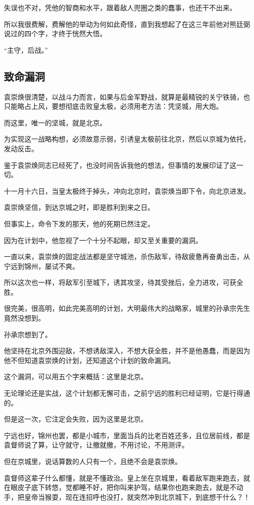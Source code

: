 \begin{multicols}{\theparacolNo}
失误也不对，凭他的智商和水平，跟着敌人兜圈之类的蠢事，也还干不出来。

所以我很费解，费解他的举动为何如此奇怪，直到我想起了在这三年前他对熊廷弼说过的四个字，才终于恍然大悟。

“主守，后战。”

\subsection{致命漏洞}
袁崇焕很清楚，以战斗力而言，如果与后金军野战，就算是最精锐的关宁铁骑，也只能略占上风，要想彻底击败皇太极，必须用老方法：凭坚城，用大炮。

而这里，唯一的坚城，就是北京。

为实现这一战略构想，必须故意示弱，引诱皇太极前往北京，然后以京城为依托，发动反击。

鉴于袁崇焕同志已经死了，也没时间告诉我他的想法，但事情的发展印证了这一切。

十一月十六日，当皇太极终于掉头，冲向北京时，袁崇焕当即下令，向北京进发。

袁崇焕坚信，到达京城之时，即是胜利到来之日。

但事实上，命令下发的那天，他的死期已然注定。

因为在计划中，他忽视了一个十分不起眼，却又至关重要的漏洞。

一直以来，袁崇焕的固定战法都是坚守城池，杀伤敌军，待敌疲惫再奋勇出击，从宁远到锦州，屡试不爽。

所以这次也一样，将敌军引至城下，诱其攻坚，待其受挫后，全力进攻，可获全胜。

很完美，很高明，如此完美高明的计划，大明最伟大的战略家，城里的孙承宗先生竟然没想到。

孙承宗想到了。

他坚持在北京外围迎敌，不想诱敌深入，不想大获全胜，并不是他愚蠢，而是因为他不但知道袁崇焕的计划，还知道这个计划的致命漏洞。

这个漏洞，可以用五个字来概括：这里是北京。

无论理论还是实战，这个计划都无懈可击，之前宁远的胜利已经证明，它是行得通的。

但是这一次，它注定会失败，因为这里是北京。

宁远也好，锦州也罢，都是小城市，里面当兵的比老百姓还多，且位居前线，都是袁督师说了算，让守就守，让撤就撤，不用讨论，不用测评。

但在京城里，说话算数的人只有一个，且绝不会是袁崇焕。

袁督师这辈子什么都懂，就是不懂政治。皇上坐在京城里，看着敌军跑来跑去，就在眼皮子底下转悠，觉都睡不好，把你叫来护驾，结果你也跑来跑去，就是不动手，把皇帝当猴耍，现在连招呼也没打，就突然冲到北京城下，到底想干什么？！


\end{multicols}
